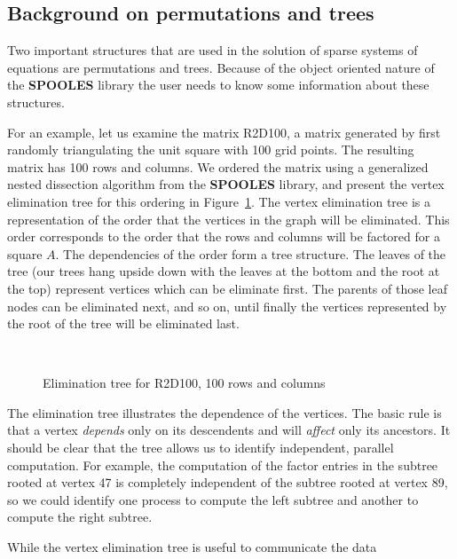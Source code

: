 \subsection{Background on permutations and trees}
\label{subsection:order:background}
\par
Two important structures that are used in the solution of sparse
systems of equations are permutations and trees.  Because of the
object oriented nature of the {\bf SPOOLES} library the user
needs to know some information about these structures.
\par
For an example, let us examine the matrix R2D100, a matrix generated by
first randomly triangulating the unit square with 100 grid points.
The resulting matrix has 100 rows and columns.
We ordered the matrix using a generalized nested dissection
algorithm from the {\bf SPOOLES} library, and present the
vertex elimination tree for this ordering in
Figure~\ref{fig:R2D100-tree-vtx}.  The vertex elimination tree is
a representation of the order that the vertices in the graph
will be eliminated.  
This order corresponds to the order that the rows
and columns will be factored for a square $A$.
The dependencies of the order form a tree structure.  
The leaves of the tree (our trees hang 
upside down with the leaves at the bottom and the root at the top)
represent vertices which can be eliminate first.  The parents
of those leaf nodes can be eliminated next, and so on, until finally
the vertices represented by the root of the tree will be
eliminated last.
\par
\begin{figure}[htbp]
\caption{Elimination tree for R2D100, 100 rows and columns}
\label{fig:R2D100-tree-vtx}
\begin{center}
\mbox{
}
\end{center}
\end{figure}
\par
The elimination tree illustrates the dependence of the vertices.
The basic  rule is that a vertex {\it depends} only on its descendents
and will {\it affect} only its ancestors.
It should be clear that the tree allows us to identify independent,
parallel computation.
For example, the computation of the factor entries in the 
subtree rooted at vertex 47 is completely independent of the
subtree rooted at vertex 89, so we could identify one process to
compute the left subtree and another to compute the right subtree.
\par
While the vertex elimination tree is useful to communicate the data

